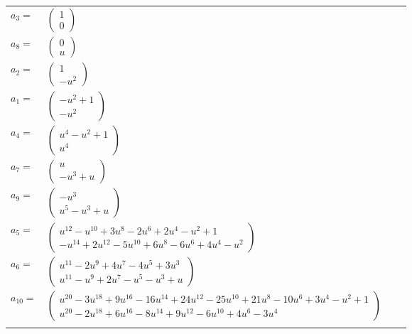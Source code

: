 \documentclass[1p]{elsarticle_modified}
\theoremstyle{definition}
\begin{document}
\begin{tabular}{m{7pt} m{180pt} m{7pt} m{180pt} }
\flushright $a_{3}=$&$\begin{pmatrix}1\\0\end{pmatrix}$ \\
\flushright $a_{8}=$&$\begin{pmatrix}0\\u\end{pmatrix}$ \\
\flushright $a_{2}=$&$\begin{pmatrix}1\\- u^2\end{pmatrix}$ \\
\flushright $a_{1}=$&$\begin{pmatrix}- u^2+1\\- u^2\end{pmatrix}$ \\
\flushright $a_{4}=$&$\begin{pmatrix}u^4- u^2+1\\u^4\end{pmatrix}$ \\
\flushright $a_{7}=$&$\begin{pmatrix}u\\- u^3+u\end{pmatrix}$ \\
\flushright $a_{9}=$&$\begin{pmatrix}- u^3\\u^5- u^3+u\end{pmatrix}$ \\
\flushright $a_{5}=$&$\begin{pmatrix}u^{12}- u^{10}+3 u^8-2 u^6+2 u^4- u^2+1\\- u^{14}+2 u^{12}-5 u^{10}+6 u^8-6 u^6+4 u^4- u^2\end{pmatrix}$ \\
\flushright $a_{6}=$&$\begin{pmatrix}u^{11}-2 u^9+4 u^7-4 u^5+3 u^3\\u^{11}- u^9+2 u^7- u^5- u^3+u\end{pmatrix}$ \\
\flushright $a_{10}=$&$\begin{pmatrix}u^{20}-3 u^{18}+9 u^{16}-16 u^{14}+24 u^{12}-25 u^{10}+21 u^8-10 u^6+3 u^4- u^2+1\\u^{20}-2 u^{18}+6 u^{16}-8 u^{14}+9 u^{12}-6 u^{10}+4 u^6-3 u^4\end{pmatrix}$\\&\end{tabular}
\end{document}
